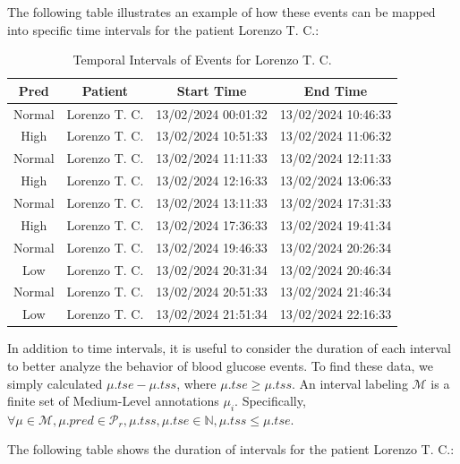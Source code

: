 \documentclass{article}
\begin{document}
The following table illustrates an example of how these events can be mapped into specific time intervals for the patient Lorenzo T. C.:

\begin{table}[h!]
    \centering
    \begin{tabular}{|c|c|c|c|}
        \hline
        \textbf{Pred} & \textbf{Patient} & \textbf{Start Time} & \textbf{End Time} \\
        \hline
        Normal & Lorenzo T. C. & 13/02/2024 00:01:32 & 13/02/2024 10:46:33 \\
        High & Lorenzo T. C. & 13/02/2024 10:51:33 & 13/02/2024 11:06:32 \\
        Normal & Lorenzo T. C. & 13/02/2024 11:11:33 & 13/02/2024 12:11:33 \\
        High & Lorenzo T. C. & 13/02/2024 12:16:33 & 13/02/2024 13:06:33 \\
        Normal & Lorenzo T. C. & 13/02/2024 13:11:33 & 13/02/2024 17:31:33 \\
        High & Lorenzo T. C. & 13/02/2024 17:36:33 & 13/02/2024 19:41:34 \\
        Normal & Lorenzo T. C. & 13/02/2024 19:46:33 & 13/02/2024 20:26:34 \\
        Low & Lorenzo T. C. & 13/02/2024 20:31:34 & 13/02/2024 20:46:34 \\
        Normal & Lorenzo T. C. & 13/02/2024 20:51:33 & 13/02/2024 21:46:34 \\
        Low & Lorenzo T. C. & 13/02/2024 21:51:34 & 13/02/2024 22:16:33 \\
        \hline
    \end{tabular}
    \caption{Temporal Intervals of Events for Lorenzo T. C.}
    \label{tab:intervals}
\end{table}

In addition to time intervals, it is useful to consider the duration of each interval to better analyze the behavior of blood glucose events. To find these data, we simply calculated \(\mu.tse - \mu.tss\), where \(\mu.tse \geq \mu.tss\). An interval labeling \(\mathcal{M}\) is a finite set of Medium-Level annotations \(\mu_i\). Specifically, \(\forall \mu \in \mathcal{M}, \mu.pred \in \mathcal{P}_r, \mu.tss, \mu.tse \in \mathbb{N}, \mu.tss \leq \mu.tse\).

The following table shows the duration of intervals for the patient Lorenzo T. C.:
\end{document}
